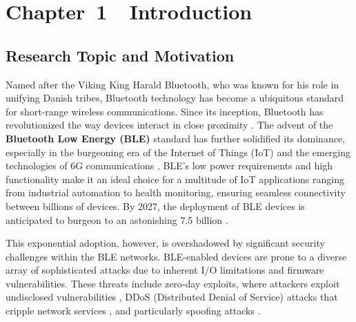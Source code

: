 \pagestyle{fancy}
\fancyhead{} %
\fancyfoot[C]{\thepage}%

\renewcommand{\headrulewidth}{1pt} %
\renewcommand{\footrulewidth}{0pt}

\section*{Chapter~1~~Introduction}
\setcounter{section}{1} \setcounter{subsection}{0} 
\setcounter{table}{0} \setcounter{figure}{0} \setcounter{equation}{0} \setcounter{definition}{0}


\subsection{Research Topic and Motivation}

\noindent Named after the Viking King Harald Bluetooth, who was known for his role in unifying Danish tribes, Bluetooth technology has become a ubiquitous standard for short-range wireless communications. Since its inception, Bluetooth has revolutionized the way devices interact in close proximity \cite{gomez2012overview}. The advent of the \textbf{Bluetooth Low Energy (BLE)} standard has further solidified its dominance, especially in the burgeoning era of the Internet of Things (IoT) and the emerging technologies of 6G communications \cite{pattnaik2022future}. BLE's low power requirements and high functionality make it an ideal choice for a multitude of IoT applications ranging from industrial automation to health monitoring, ensuring seamless connectivity between billions of devices. By 2027, the deployment of BLE devices is anticipated to burgeon to an astonishing 7.5 billion \cite{market}.

\vspace{8pt}

This exponential adoption, however, is overshadowed by significant security challenges within the BLE networks. BLE-enabled devices are prone to a diverse array of sophisticated attacks due to inherent I/O limitations and firmware vulnerabilities. These threats include zero-day exploits, where attackers exploit undisclosed vulnerabilities \cite{stellios2019advanced}, DDoS (Distributed Denial of Service) attacks that cripple network services \cite{ditton2020proof}, and particularly spoofing attacks \cite{wu2020blesa}.

